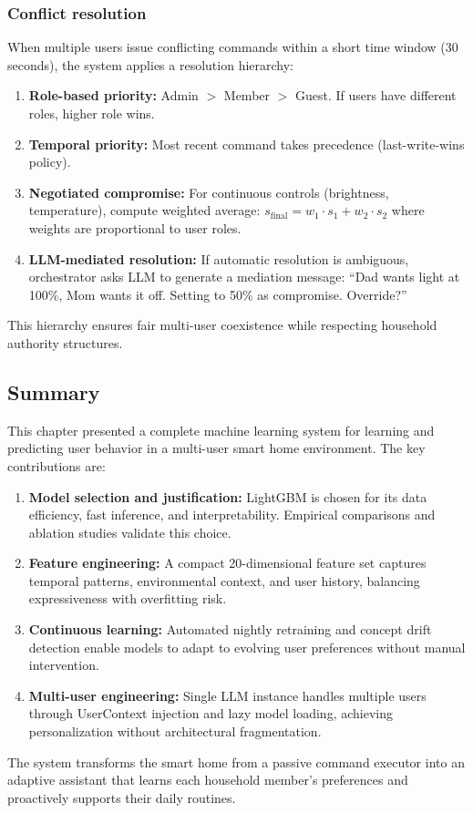 \subsubsection{Conflict resolution}

When multiple users issue conflicting commands within a short time window (30 seconds), the system applies a resolution hierarchy:

\begin{enumerate}
    \item \textbf{Role-based priority:} Admin $>$ Member $>$ Guest. If users have different roles, higher role wins.
    
    \item \textbf{Temporal priority:} Most recent command takes precedence (last-write-wins policy).
    
    \item \textbf{Negotiated compromise:} For continuous controls (brightness, temperature), compute weighted average: $s_{\text{final}} = w_1 \cdot s_1 + w_2 \cdot s_2$ where weights are proportional to user roles.
    
    \item \textbf{LLM-mediated resolution:} If automatic resolution is ambiguous, orchestrator asks LLM to generate a mediation message: ``Dad wants light at 100\%, Mom wants it off. Setting to 50\% as compromise. Override?''
\end{enumerate}

This hierarchy ensures fair multi-user coexistence while respecting household authority structures.

\subsection{Summary}

This chapter presented a complete machine learning system for learning and predicting user behavior in a multi-user smart home environment. The key contributions are:

\begin{enumerate}
    \item \textbf{Model selection and justification:} LightGBM is chosen for its data efficiency, fast inference, and interpretability. Empirical comparisons and ablation studies validate this choice.
    
    \item \textbf{Feature engineering:} A compact 20-dimensional feature set captures temporal patterns, environmental context, and user history, balancing expressiveness with overfitting risk.
    
    \item \textbf{Continuous learning:} Automated nightly retraining and concept drift detection enable models to adapt to evolving user preferences without manual intervention.
    
    \item \textbf{Multi-user engineering:} Single LLM instance handles multiple users through UserContext injection and lazy model loading, achieving personalization without architectural fragmentation.
\end{enumerate}

The system transforms the smart home from a passive command executor into an adaptive assistant that learns each household member's preferences and proactively supports their daily routines.
